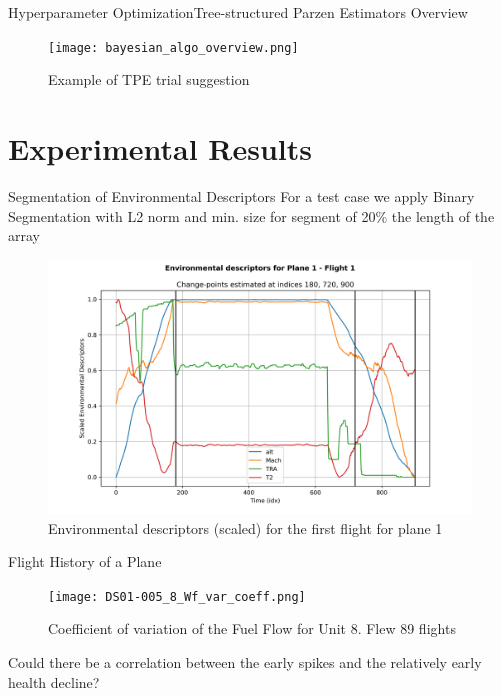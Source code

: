 \documentclass{beamer}
\begin{document}
            \begin{frame}{Hyperparameter Optimization}{Tree-structured Parzen Estimators Overview}
                \begin{figure}[placement]
                    \centering
                    \texttt{[image: bayesian\_algo\_overview.png]}
                    \caption{Example of TPE trial suggestion \cite{pmlr-v139-tiao21a}}
                \end{figure}
            \end{frame}

    \section{Experimental Results}

        \begin{frame}{Segmentation of Environmental Descriptors}
            For a test case we apply Binary Segmentation with L2 norm and min. size for segment of 20\% the length of the array
            \begin{figure}
                \centering
                \includegraphics[scale=0.35]{environment_split_1_1.png}
                \caption{Environmental descriptors (scaled) for the first flight for plane 1}
            \end{figure}
        \end{frame}

        \begin{frame}{Flight History of a Plane}
            \begin{figure}
                \centering
                \texttt{[image: DS01-005\_8\_Wf\_var\_coeff.png]}
                \caption{Coefficient of variation of the Fuel Flow for Unit 8. Flew 89 flights}
            \end{figure}
            Could there be a correlation between the early spikes and the relatively early health decline?
        \end{frame}
\end{document}
